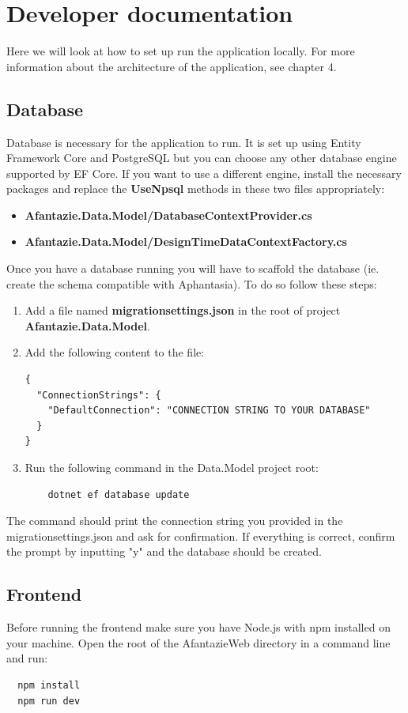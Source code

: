 \section{Developer documentation}
Here we will look at how to set up run the application locally. For more information about the architecture of the application, see chapter 4.

\subsection{Database}
Database is necessary for the application to run.
It is set up using Entity Framework Core and PostgreSQL but you can choose any other database engine supported by EF Core.
If you want to use a different engine, install the necessary packages
and replace the \textbf{UseNpsql} methods in these two files appropriately:
\begin{itemize}
  \item \textbf{Afantazie.Data.Model/DatabaseContextProvider.cs}
  \item \textbf{Afantazie.Data.Model/DesignTimeDataContextFactory.cs}
\end{itemize}

Once you have a database running you will have to scaffold the database (ie. create the schema compatible with Aphantasia).
To do so follow these steps:
\begin{enumerate}
  \item Add a file named \textbf{migrationsettings.json} in the root of project \textbf{Afantazie.Data.Model}.
  \item Add the following content to the file:
  \begin{lstlisting}
{
  "ConnectionStrings": {
    "DefaultConnection": "CONNECTION STRING TO YOUR DATABASE"
  }
}
  \end{lstlisting}
  \item Run the following command in the Data.Model project root:
  \begin{lstlisting}
    dotnet ef database update
  \end{lstlisting}
\end{enumerate}

The command should print the connection string you provided in the migrationsettings.json and ask for confirmation.
If everything is correct, confirm the prompt by inputting "y" and the database should be created.

\subsection{Frontend}
Before running the frontend make sure you have Node.js with npm installed on your machine.
Open the root of the AfantazieWeb directory in a command line and run:
\begin{lstlisting}
  npm install
  npm run dev
\end{lstlisting}

